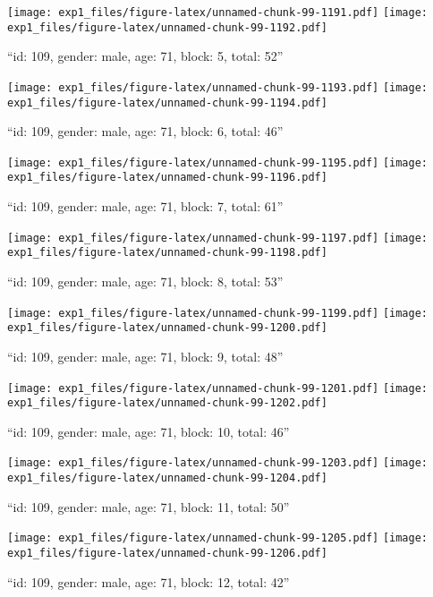 \documentclass[,]{article}
\begin{document}
\texttt{[image: exp1\_files/figure-latex/unnamed-chunk-99-1191.pdf]}
\texttt{[image: exp1\_files/figure-latex/unnamed-chunk-99-1192.pdf]}

\newpage
[1] 

``id: 109, gender: male, age: 71, block: 5, total: 52''

\texttt{[image: exp1\_files/figure-latex/unnamed-chunk-99-1193.pdf]}
\texttt{[image: exp1\_files/figure-latex/unnamed-chunk-99-1194.pdf]}

\newpage
[1] 

``id: 109, gender: male, age: 71, block: 6, total: 46''

\texttt{[image: exp1\_files/figure-latex/unnamed-chunk-99-1195.pdf]}
\texttt{[image: exp1\_files/figure-latex/unnamed-chunk-99-1196.pdf]}

\newpage
[1] 

``id: 109, gender: male, age: 71, block: 7, total: 61''

\texttt{[image: exp1\_files/figure-latex/unnamed-chunk-99-1197.pdf]}
\texttt{[image: exp1\_files/figure-latex/unnamed-chunk-99-1198.pdf]}

\newpage
[1] 

``id: 109, gender: male, age: 71, block: 8, total: 53''

\texttt{[image: exp1\_files/figure-latex/unnamed-chunk-99-1199.pdf]}
\texttt{[image: exp1\_files/figure-latex/unnamed-chunk-99-1200.pdf]}

\newpage
[1] 

``id: 109, gender: male, age: 71, block: 9, total: 48''

\texttt{[image: exp1\_files/figure-latex/unnamed-chunk-99-1201.pdf]}
\texttt{[image: exp1\_files/figure-latex/unnamed-chunk-99-1202.pdf]}

\newpage
[1] 

``id: 109, gender: male, age: 71, block: 10, total: 46''

\texttt{[image: exp1\_files/figure-latex/unnamed-chunk-99-1203.pdf]}
\texttt{[image: exp1\_files/figure-latex/unnamed-chunk-99-1204.pdf]}

\newpage
[1] 

``id: 109, gender: male, age: 71, block: 11, total: 50''

\texttt{[image: exp1\_files/figure-latex/unnamed-chunk-99-1205.pdf]}
\texttt{[image: exp1\_files/figure-latex/unnamed-chunk-99-1206.pdf]}

\newpage
[1] 

``id: 109, gender: male, age: 71, block: 12, total: 42''
\end{document}
